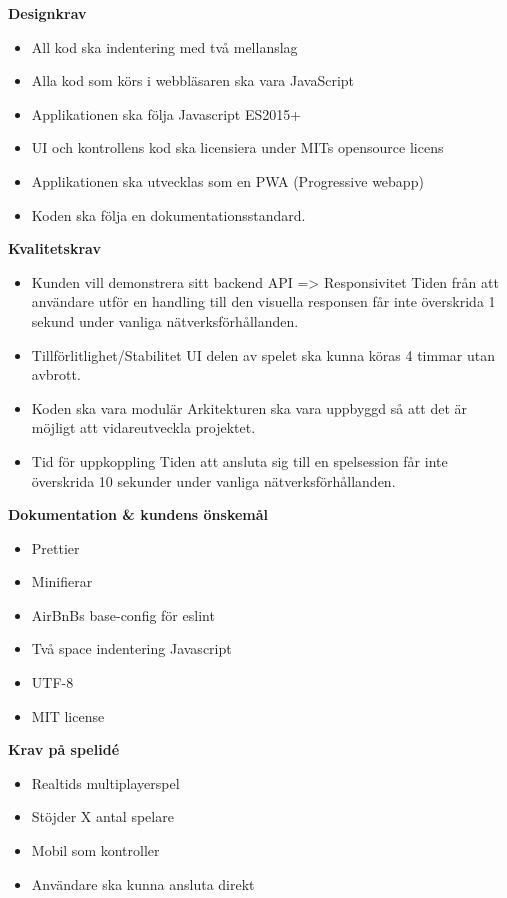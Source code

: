 \documentclass[10pt]{article}
\begin{document}
	\bigskip
	\begin{center}\textbf{Designkrav}\end{center}
	\begin{itemize}
		\item All kod ska indentering med två mellanslag
		\item Alla kod som körs i webbläsaren ska vara JavaScript
		\item Applikationen ska följa Javascript ES2015+
		\item UI och kontrollens kod ska licensiera under MITs opensource licens
		\item Applikationen ska utvecklas som en PWA (Progressive webapp)
		\item Koden ska följa en dokumentationsstandard. 
		
	\end{itemize}
	\bigskip
	\begin{center}\textbf{Kvalitetskrav}\end{center}
	\begin{itemize}
		\item Kunden vill demonstrera sitt backend API => Responsivitet
		Tiden från att användare utför en handling till den visuella responsen får inte överskrida 1 sekund under vanliga nätverksförhållanden.
		\item Tillförlitlighet/Stabilitet
		UI delen av spelet ska kunna köras 4 timmar utan avbrott.
		\item Koden ska vara modulär
		Arkitekturen ska vara uppbyggd så att det är möjligt att vidareutveckla projektet.
		\item Tid för uppkoppling
		Tiden att ansluta sig till en spelsession får inte överskrida 10 sekunder under vanliga nätverksförhållanden. 
		\end{itemize}
	
		\bigskip
		\begin{center}\textbf{Dokumentation \& kundens önskemål}\end{center}
		\begin{itemize}
			\item Prettier
			\item Minifierar
			\item AirBnBs base-config för eslint
			\item Två space indentering Javascript
			\item UTF-8
			\item MIT license
		\end{itemize}
	\begin{center}\textbf{Krav på spelidé}\end{center}
	\begin{itemize}
		\item Realtids multiplayerspel
		\item Stöjder X antal spelare
		\item Mobil som kontroller
		\item Användare ska kunna ansluta direkt
	\end{itemize}
\end{document}
